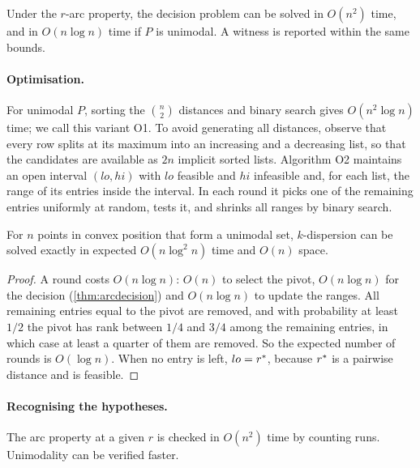 \begin{theorem}\label{thm:arcdecision}
Under the $r$-arc property, the decision problem can be solved in
$O(n^2)$ time, and in $O(n\log n)$ time if $P$ is unimodal. A witness is
reported within the same bounds.
\end{theorem}

\paragraph{Optimisation.}
For unimodal $P$, sorting the $\binom n2$ distances and binary search gives
$O(n^2\log n)$ time; we call this variant \textsc{O1}. To avoid generating
all distances, observe that every row splits at its maximum into an increasing
and a decreasing list, so that the candidates are available as $2n$ implicit
sorted lists. Algorithm \textsc{O2} maintains an open interval $(lo,hi)$ with
$lo$ feasible and $hi$ infeasible and, for each list, the range of its entries
inside the interval. In each round it picks one of the remaining entries
uniformly at random, tests it, and shrinks all ranges by binary search.

\begin{theorem}\label{thm:arcopt}
For $n$ points in convex position that form a unimodal set, $k$-dispersion can
be solved exactly in expected $O(n\log^2n)$ time and $O(n)$ space.
\end{theorem}
\begin{proof}
A round costs $O(n\log n)$: $O(n)$ to select the pivot, $O(n\log n)$ for the
decision (\cref{thm:arcdecision}) and $O(n\log n)$ to update the ranges. All
remaining entries equal to the pivot are removed, and with probability at
least $1/2$ the pivot has rank between $1/4$ and $3/4$ among the remaining
entries, in which case at least a quarter of them are removed. So the expected
number of rounds is $O(\log n)$. When no entry is left, $lo=r^{*}$, because
$r^{*}$ is a pairwise distance and is feasible.
\end{proof}

\paragraph{Recognising the hypotheses.}
The arc property at a given $r$ is checked in $O(n^2)$ time by counting runs.
Unimodality can be verified faster.

